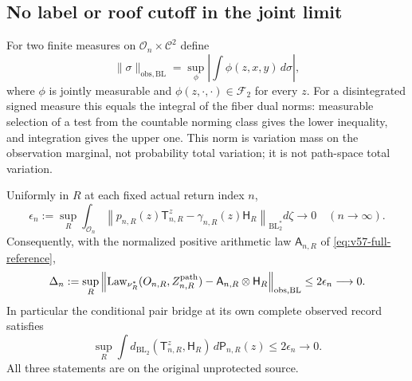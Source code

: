 \subsection{No label or roof cutoff in the joint limit}
For two finite measures on $\mathcal O_n\times\mathcal C^2$ define
\[
 \|\sigma\|_{\mathrm{obs},\mathrm{BL}}
  =\sup_\phi\left|\int\phi(z,x,y)\,d\sigma\right|,
\]
where $\phi$ is jointly measurable and $\phi(z,\cdot,\cdot)\in\mathcal F_2$
for every $z$. For a disintegrated signed measure this equals the
integral of the fiber dual norms: measurable selection of a test from
the countable norming class gives the lower inequality, and integration
gives the upper one. This norm is variation mass on the observation
marginal, not probability total variation; it is not path-space total
variation.

\begin{theorem}
\label{thm:v57-global-coupled}
Uniformly in $R$ at each fixed actual return index $n$,
\begin{equation}\label{eq:v57-global-pair-error}
 \epsilon_n:=\sup_R\int_{\mathcal O_n}
 \left\|p_{n,R}(z)\mathsf T_{n,R}^{z}
                  -\gamma_{n,R}(z)\mathsf H_R\right\|_{\mathrm{BL}_2^*}
                          d\zeta\longrightarrow0\quad(n\to\infty).
\end{equation}
Consequently, with the normalized positive arithmetic law
$\mathsf A_{n,R}$ of \eqref{eq:v57-full-reference},
\begin{equation}\label{eq:v57-global-joint-law}
 \Delta_n:=\sup_R
 \left\|\operatorname{Law}_{\nu_R^*}(O_{n,R},Z_{n,R}^{\rm path})
                   -\mathsf A_{n,R}\otimes\mathsf H_R
       \right\|_{\mathrm{obs},\mathrm{BL}}
                          \le2\epsilon_n\longrightarrow0.
\end{equation}
In particular the conditional pair bridge at its own complete observed
record satisfies
\begin{equation}\label{eq:v57-global-conditional-mean}
 \sup_R\int d_{\mathrm{BL}_2}(\mathsf T_{n,R}^z,\mathsf H_R)
                                             \,d\mathsf P_{n,R}(z)
                                             \le2\epsilon_n\to0.
\end{equation}
All three statements are on the original unprotected source.
\end{theorem}
